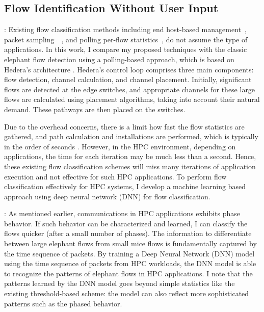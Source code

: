 \subsection{Flow Identification Without User Input}


\vspace{0.08in}
:
Existing flow classification methods including end host-based
management~\cite{xu2015identifying},
packet sampling~\cite{suh2014opensample}~\cite{afek2015sampling},
and polling per-flow statistics~\cite{yang2020flow}, do not assume
the type of applications. In this work, I compare my proposed techniques with
the classic elephant flow detection using a polling-based approach,
which is based on Hedera's architecture \cite{al2010hedera}.
Hedera's control loop comprises
three main components: flow detection, channel calculation, and channel
placement. Initially, significant 
flows are detected at the edge switches, and appropriate channels for these 
large flows are calculated using placement algorithms, taking into account 
their natural demand. These pathways are then placed on the switches.

Due to the overhead concerns, there is a limit how fast the flow statistics
are gathered, and path calculation and installations are performed, which is typically
in the order of seconds \cite{al2010hedera}.
However, in the HPC environment, depending
on applications, the time for each iteration may be much less than a second.
Hence, these existing flow classification schemes will miss many iterations
of application execution and not effective for such HPC applications.
To perform flow classification effectively for HPC systems, I develop
a machine learning based approach using deep neural network (DNN)
for flow classification.

\vspace{0.08in}
:
As mentioned earlier, communications in HPC applications exhibits phase
behavior. If such behavior can be characterized and learned, I can classify
the flows quicker (after a small number of phases).
The information to differentiate between large elephant flows from
small mice flows is fundamentally captured by the time sequence of packets.
By training a Deep Neural Network (DNN) model using the time sequence of
packets from HPC workloads, the DNN model is able to recognize the
patterns of elephant flows in HPC applications. I note that the patterns
learned by the DNN model goes beyond simple statistics like
the existing threshold-based scheme: the model can also reflect more
sophisticated patterns such as the phased behavior. 


